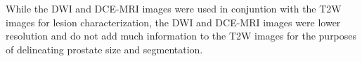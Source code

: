 While the DWI and DCE-MRI images were used in conjuntion with the T2W
images for lesion characterization, the DWI and DCE-MRI images were lower
resolution and do not add much information to the T2W images for the purposes
of delineating prostate size and segmentation.
